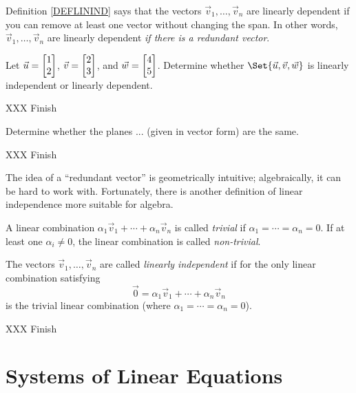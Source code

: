 Definition \ref{DEFLININD} says that the vectors $\vec v_1,\ldots,\vec v_n$ are linearly dependent
if you can remove at least one vector without changing the span. In other words, $\vec v_1,\ldots,\vec v_n$ 
are linearly dependent \emph{if there is a redundant vector}.

\begin{example}
	Let $\vec u=\mat{1\\2}$, $\vec v=\mat{2\\3}$, and $\vec w=\mat{4\\5}$. Determine whether
	$\Set{\vec u,\vec v,\vec w}$ is linearly independent or linearly dependent.

	XXX Finish
\end{example}

\begin{example}
	Determine whether the planes ... (given in vector form) are the same.

	XXX Finish
\end{example}

The idea of a ``redundant vector'' is geometrically intuitive; algebraically, it can be hard
to work with. Fortunately, there is another definition of linear independence more suitable
for algebra.

\begin{definition}
	A linear combination $\alpha_1\vec v_1+\cdots+\alpha_n\vec v_n$ is called
	\emph{trivial}
	if $\alpha_1=\cdots=\alpha_n=0$. If at least one $\alpha_i\neq 0$,
	the linear combination is called \emph{non-trivial}.
\end{definition}

\begin{definition}
	\label{DEFLININDII}
	The vectors $\vec v_1,\ldots,\vec v_n$ are called \emph{linearly independent}
	if for the only linear combination satisfying
	\[
		\vec 0=\alpha_1\vec v_1+\cdots+\alpha_n\vec v_n
	\]
	is the trivial linear combination (where $\alpha_1=\cdots=\alpha_n=0$).
\end{definition}

XXX Finish

\section{Systems of Linear Equations}

